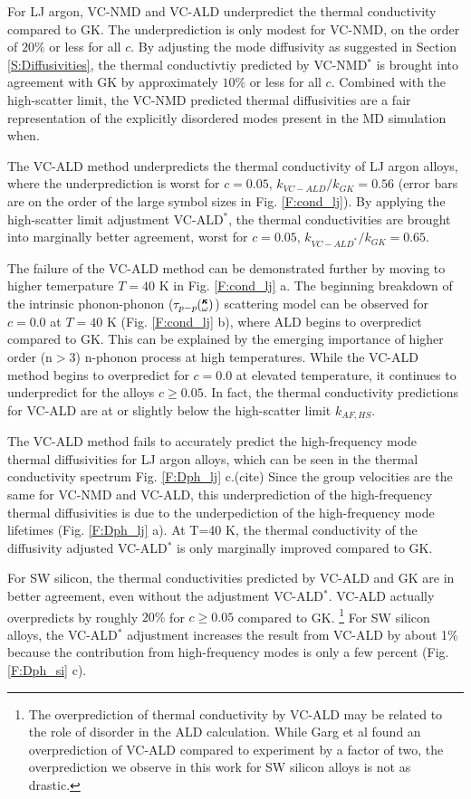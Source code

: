 \documentclass[aps,prb,twocolumn,superscriptaddress,amsmath,amssymb,floatfix]{revtex4}
\newcommand{\kw}{\mspace{-4.0mu}\left(\mspace{-8.0mu}
\begin{smallmatrix}&\pmb{\kappa} \\&\omega\end{smallmatrix}
\mspace{-3.0mu}\right)}
\begin{document}
For LJ argon, VC-NMD and VC-ALD underpredict the thermal 
conductivity compared to GK. 
The underprediction is only modest for VC-NMD, on the order of 
$20\%$ or less for all $c$. By adjusting the mode diffusivity as 
suggested 
in Section \ref{S:Diffusivities}, 
the thermal conductivtiy predicted by VC-NMD$^*$ is 
brought 
into agreement with GK by approximately $10\%$ or less for all $c$. 
Combined with the high-scatter limit, the VC-NMD predicted thermal 
diffusivities are a fair representation of the explicitly 
disordered modes present in the MD simulation when.

The VC-ALD method underpredicts the thermal conductivity of LJ argon 
alloys, 
where 
the underprediction is worst for $c=0.05$, $k_{VC-ALD} / k_{GK} = 0.56$ 
(error bars are on the order 
of the large symbol sizes in Fig. \ref{F:cond_lj}). 
By applying the high-scatter limit 
adjustment VC-ALD$^*$, the thermal conductivities are brought into 
marginally 
better agreement, worst for $c=0.05$, $k_{VC-ALD^*} / k_{GK} = 0.65$. 

The failure of the VC-ALD method can be demonstrated further 
by moving to higher temerpature $T=40$ K in Fig. \ref{F:cond_lj} a.
The beginning breakdown of the intrinsic phonon-phonon ($\tau_{p-p}\kw$) 
scattering model 
can be observed for $c=0.0$ at 
$T=40$ K (Fig. \ref{F:cond_lj} b), 
where ALD begins to overpredict compared to GK. 
This 
can be explained by the emerging importance of higher order (n$> 3$) 
n-phonon process at high temperatures.\cite{turney_predicting_2009} 
While the VC-ALD method begins to overpredict for $c=0.0$ 
at elevated temperature, 
it continues to underpredict for the alloys $c \ge 0.05$.  In fact, the 
thermal conductivity predictions for VC-ALD are at or slightly below the  
high-scatter limit $k_{AF,HS}$. 

The VC-ALD method fails to 
accurately predict the high-frequency mode thermal diffusivities for 
LJ argon alloys, which can be seen in the thermal conductivity 
spectrum Fig. \ref{F:Dph_lj} c.(cite) 
Since the group velocities are the same for VC-NMD and VC-ALD, 
this underprediction of the high-frequency thermal diffusivities is 
due to the underpediction of the high-frequency 
mode lifetimes (Fig. \ref{F:Dph_lj} a). 
At T=40 K, the thermal conductivity of the diffusivity adjusted 
VC-ALD$^*$ is only marginally improved compared to GK. 

For SW silicon, the thermal conductivities predicted by VC-ALD and GK 
are in better agreement, even without the adjustment VC-ALD$^*$. VC-ALD 
actually overpredicts by roughly $20\%$ for $c \ge 0.05$ compared to GK.
\footnote[4]
{The overprediction of thermal conductivity by VC-ALD 
may be related to the role of disorder in the ALD calculation.
\cite{garg_role_2011,turney_predicting_2009} While Garg et al found 
an overprediction of VC-ALD compared to experiment by a factor of two, 
the overprediction 
we observe in this work for SW silicon alloys is not as drastic.}   
For SW silicon alloys, the VC-ALD$^*$ adjustment  
increases the result from VC-ALD by about 1$\%$ because the contribution 
from high-frequency modes is only a few percent (Fig. \ref{F:Dph_si} c). 
\end{document}
